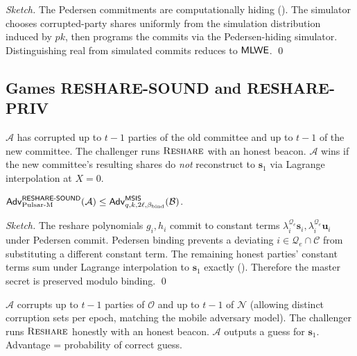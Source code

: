 \begin{proof}[Sketch]
The Pedersen commitments are computationally hiding
(). The simulator chooses corrupted-party
shares uniformly from the simulation distribution induced by
$\mathit{pk}$, then programs the commits via the Pedersen-hiding
simulator. Distinguishing real from simulated commits reduces to
$\mathsf{MLWE}$. \qed
\end{proof}

\subsection{Games RESHARE-SOUND and RESHARE-PRIV}
\label{sec:game-reshare}

\begin{game}
\label{game:reshare-sound}
$\mathcal{A}$ has corrupted up to $t-1$ parties of the old
committee and up to $t-1$ of the new committee. The challenger runs
$\textsc{Reshare}$ with an honest beacon. $\mathcal{A}$ wins if the new
committee's resulting shares do \emph{not} reconstruct to
$\mathbf{s}_1$ via Lagrange interpolation at $X = 0$.
\end{game}

\begin{theorem}
\label{thm:reshare-sound}
$\mathsf{Adv}^{\mathsf{RESHARE\textsf{-}SOUND}}_{\mathrm{Pulsar\text{-}M}}(\mathcal{A}) \le \mathsf{Adv}^{\mathsf{MSIS}}_{q, k, 2\ell, \beta_{\mathrm{bind}}}(\mathcal{B})$.
\end{theorem}

\begin{proof}[Sketch]
The reshare polynomials $g_i, h_i$ commit to constant terms
$\lambda_i^{\mathcal{Q}_e} \mathbf{s}_i, \lambda_i^{\mathcal{Q}_e} \mathbf{u}_i$
under Pedersen commit. Pedersen binding prevents a deviating
$i \in \mathcal{Q}_e \cap \mathcal{C}$ from substituting a different
constant term. The remaining honest parties' constant terms sum
under Lagrange interpolation to $\mathbf{s}_1$ exactly
(). Therefore the master secret is preserved
modulo binding. \qed
\end{proof}

\begin{game}
\label{game:reshare-priv}
$\mathcal{A}$ corrupts up to $t-1$ parties of $\mathcal{O}$ and up to
$t-1$ of $\mathcal{N}$ (allowing distinct corruption sets per epoch,
matching the mobile adversary model). The challenger runs $\textsc{Reshare}$
honestly with an honest beacon. $\mathcal{A}$ outputs a guess for
$\mathbf{s}_1$. Advantage = probability of correct guess.
\end{game}

